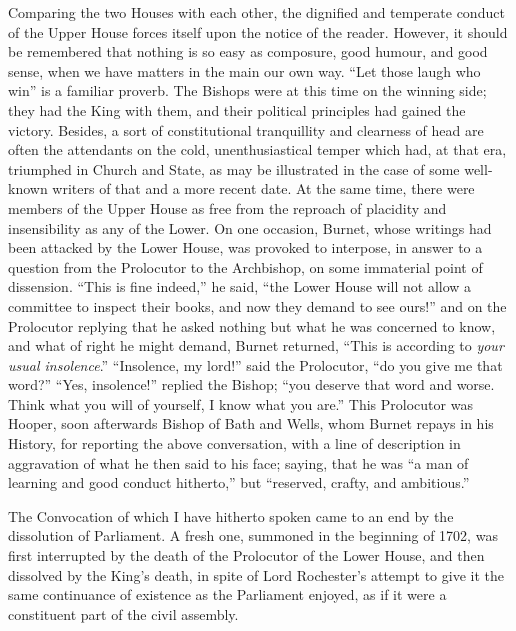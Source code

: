 Comparing the two Houses with
each other, the dignified and temperate conduct of the Upper House
forces itself upon the notice of the reader. However, it should be
remembered that nothing is so easy as composure, good humour, and good
sense, when we have matters in the main our own way. ``Let those laugh
who win'' is a familiar proverb. The Bishops were at this time on
the winning side; they had the King with them, and their political
principles had gained the victory. Besides, a sort of constitutional
tranquillity and clearness of head are often the attendants on the
cold, unenthusiastical temper which had, at that era, triumphed in
Church and State, as may be illustrated in the case of some well-known
writers of that and a more recent date. At the same time, there were
members of the Upper House as free from the reproach of placidity and
insensibility as any of the Lower. On one occasion, Burnet, whose
writings had been attacked by the Lower House, was provoked to
interpose, in answer to a question from the Prolocutor to the
Archbishop, on some immaterial point of dissension. ``This is fine
indeed,'' he said, ``the Lower House will not allow a committee to
inspect their books, and now they demand to see ours!'' and on the
Prolocutor replying that he asked nothing but what he was concerned to
know, and what of right he might demand, Burnet returned, ``This is
according to \emph{your usual insolence}.'' ``Insolence, my lord!'' said
the Prolocutor, ``do you give me that word?'' ``Yes, insolence!'' replied
the Bishop; ``you deserve that word and worse. Think what you will of
yourself, I know what you are.'' This Prolocutor was Hooper, soon
afterwards Bishop of Bath and Wells, whom Burnet repays in his
History, for reporting the above conversation, with a line of
description in aggravation of what he then said to his face; saying,
that he was ``a man of learning and good conduct hitherto,'' but ``reserved,
crafty, and ambitious.''

The Convocation of which I
have hitherto spoken came to an end by the dissolution of Parliament.
A fresh one, summoned in the beginning of 1702, was first interrupted
by the death of the Prolocutor of the Lower House, and then
dissolved by the King's death, in spite of Lord Rochester's attempt to
give it the same continuance of existence as the Parliament enjoyed,
as if it were a constituent part of the civil assembly.

